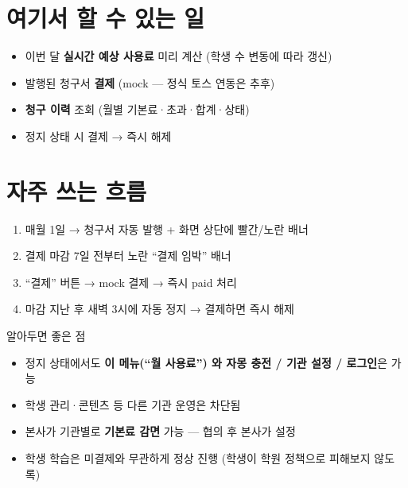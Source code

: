 \section*{여기서 할 수 있는 일}
\begin{itemize}[leftmargin=1.2em]
  \item 이번 달 \textbf{실시간 예상 사용료} 미리 계산 (학생 수 변동에 따라 갱신)
  \item 발행된 청구서 \textbf{결제} (mock — 정식 토스 연동은 추후)
  \item \textbf{청구 이력} 조회 (월별 기본료·초과·합계·상태)
  \item 정지 상태 시 결제 → 즉시 해제
\end{itemize}

\section*{자주 쓰는 흐름}
\begin{enumerate}
  \item 매월 1일 → 청구서 자동 발행 + 화면 상단에 빨간/노란 배너
  \item 결제 마감 7일 전부터 노란 ``결제 임박'' 배너
  \item ``결제'' 버튼 → mock 결제 → 즉시 paid 처리
  \item 마감 지난 후 새벽 3시에 자동 정지 → 결제하면 즉시 해제
\end{enumerate}

\begin{tipbox}{알아두면 좋은 점}
\begin{itemize}[leftmargin=1.2em]
  \item 정지 상태에서도 \textbf{이 메뉴(``월 사용료'') 와 자몽 충전 / 기관 설정 / 로그인}은 가능
  \item 학생 관리·콘텐츠 등 다른 기관 운영은 차단됨
  \item 본사가 기관별로 \textbf{기본료 감면} 가능 — 협의 후 본사가 설정
  \item 학생 학습은 미결제와 무관하게 정상 진행 (학생이 학원 정책으로 피해보지 않도록)
\end{itemize}
\end{tipbox}
